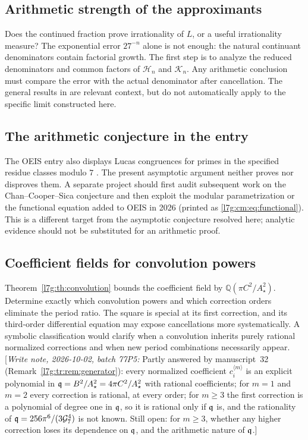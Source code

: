 \documentclass[11pt,letterpaper]{article}
\theoremstyle{remark}\newtheorem{remark}[theorem]{Remark}
\newcommand{\G}{\mathcal G_7}\newcommand{\Ast}{A_\star}
\newcommand{\Q}{\mathbb Q}\newcommand{\tht}{\vartheta}
\newcommand{\writenote}[1]{\textup{[}\emph{Write note, 2026-10-02, batch 77P5:} #1\textup{]}}
\newcounter{l7gtrsavedeq}
\begin{document}
\subsection{Arithmetic strength of the approximants}
Does the continued fraction prove irrationality of $L$, or a useful
irrationality measure? The exponential error $27^{-n}$ alone is not
enough: the natural continuant denominators contain factorial growth.
The first step is to analyze the reduced denominators and common
factors of $\mathcal H_n$ and $\mathcal K_n$. Any arithmetic conclusion
must compare the error with the actual denominator after cancellation.
The general results in \cite{l7g:cohenzudilin} are relevant context, but
do not automatically apply to the specific limit constructed here.

\subsection{The arithmetic conjecture in the entry}\label{l7g:sec:lucas}
The OEIS entry also displays Lucas congruences for primes in the
specified residue classes modulo $7$ \cite{l7g:oeis279619}. The present
asymptotic argument neither proves nor disproves them. A separate
project should first audit subsequent work on the Chan--Cooper--Sica
conjecture and then exploit the modular parametrization or the
functional equation added to OEIS in 2026 (printed as
\eqref{l7g:cm:eq:functional}). This is a different target
from the asymptotic conjecture resolved here; analytic evidence should
not be substituted for an arithmetic proof.

\subsection{Coefficient fields for convolution powers}\label{l7g:tr:sec:fields}
Theorem~\ref{l7g:th:convolution} bounds the coefficient field by
$\Q(\pi C^2/\Ast^2)$. Determine exactly which convolution powers and
which correction orders eliminate the period ratio. The square is
special at its first correction, and its third-order differential
equation may expose cancellations more systematically. A symbolic
classification would clarify when a convolution inherits purely
rational normalized corrections and when new period combinations
necessarily appear.
\writenote{Partly answered by manuscript~32
(Remark~\ref{l7g:tr:rem:generator}): every normalized coefficient
$c_i^{\langle m\rangle}$ is an explicit polynomial in
$\qq=B^2/\Ast^2=4\pi C^2/\Ast^2$ with rational coefficients; for $m=1$ and
$m=2$ every correction is rational, at every order; for $m\ge3$ the first
correction is a polynomial of degree one in $\mathfrak q$, so it is rational only if
$\mathfrak q$ is, and the rationality of $\qq=256\pi^6/(3\G^4)$ is not known. Still
open: for $m\ge3$, whether any higher correction loses its dependence on
$\mathfrak q$, and the arithmetic nature of $\mathfrak q$.}
\end{document}
